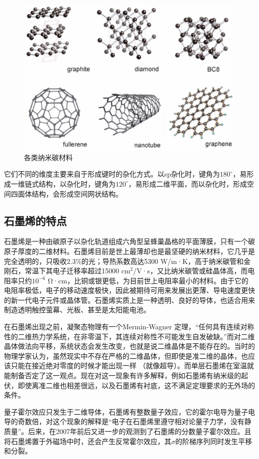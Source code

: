\documentclass[UTF8,9pt]{ctexart}
\newcommand\sg{\sigma}                                                 %
\newcommand\sub{\subsection}                                           %
\begin{document}
\begin{figure}[htbp]
    \centering
    \includegraphics[scale=0.2]{2.jpg}
    \caption{各类纳米碳材料}
\end{figure}

它们不同的维度主要来自于形成键时的杂化方式。以sp杂化时，键角为$180^{\circ}$，易形成一维链式结构，以杂化时，键角为$120^{\circ}$，易形成二维平面，而以杂化时，形成空间四面体结构，会形成空间网状结构。
\sub{石墨烯的特点}
石墨烯是一种由碳原子以杂化轨道组成六角型呈蜂巢晶格的平面薄膜，只有一个碳原子厚度的二维材料。石墨烯目前是世上最薄却也是最坚硬的纳米材料，它几乎是完全透明的，只吸收2.3\%的光；导热系数高达5300 W/m·K，高于纳米碳管和金刚石，常温下其电子迁移率超过15000 cm${}^2$/V·s，又比纳米碳管或硅晶体高，而电阻率只约$10^{-6}$ Ω·cm，比铜或银更低，为目前世上电阻率最小的材料。由于它的电阻率极低，电子的移动速度极快，因此被期待可用来发展出更薄、导电速度更快的新一代电子元件或晶体管。石墨烯实质上是一种透明、良好的导体，也适合用来制造透明触控萤幕、光板、甚至是太阳能电池。

在石墨烯出现之前，凝聚态物理有一个Mermin-Wagner 定理，``任何具有连续对称性的二维热力学系统，在非零温下，其连续对称性不可能发生自发破缺。''而对二维晶体做法向平移，系统状态会发生改变，也就是说二维晶体是不能存在的。当时的物理学家认为，虽然现实中不存在严格的二维晶体，但即使是准二维的晶体，也应该只能在接近绝对零度的时候才能出现一样 （就像超导）。而单层石墨烯在室温就能制备否定了这一观点。现在对这一现象有许多解释，例如石墨烯有纳米级的起伏，即使离准二维也相差很远，以及石墨烯有衬底，这不满足定理要求的无外场的条件。

量子霍尔效应只发生于二维导体，石墨烯有整数量子效应，它的霍尔电导为量子电导的奇数倍，对这个现象的解释是``电子在石墨烯里遵守相对论量子力学，没有静质量''。后来，在2007年前后又进一步的观测到了石墨烯的分数量子霍尔效应。且将石墨烯置于外磁场中时，还会产生反常霍尔效应，其$\sg$的阶梯序列同时发生平移和分裂。
\end{document}
